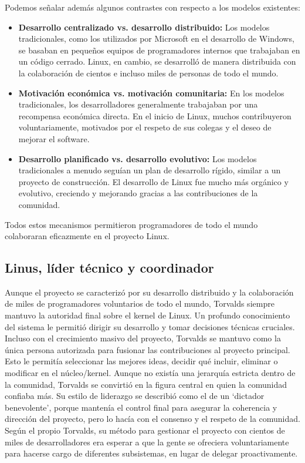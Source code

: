 \documentclass[a4paper,12pt]{article}
\begin{document}
Podemos señalar además algunos contrastes con respecto a los modelos existentes:

\begin{itemize}
    \item \textbf{Desarrollo centralizado vs. desarrollo distribuido:} 
        Los modelos tradicionales, como los utilizados por Microsoft en el
        desarrollo de Windows, se basaban en pequeños equipos de programadores
        internos que trabajaban en un código cerrado. Linux, en cambio, se
        desarrolló de manera distribuida con la colaboración de cientos e
        incluso miles de personas de todo el mundo.
    \item \textbf{Motivación económica vs. motivación comunitaria:}  En los
    modelos tradicionales, los desarrolladores generalmente trabajaban por una
    recompensa económica directa. En el inicio de Linux, muchos contribuyeron
    voluntariamente, motivados por el respeto de sus colegas y el deseo de
    mejorar el software.
    \item \textbf{Desarrollo planificado vs. desarrollo evolutivo:} Los modelos
    tradicionales a menudo seguían un plan de desarrollo rígido, similar a un
    proyecto de construcción. El desarrollo de Linux fue mucho más orgánico y
    evolutivo, creciendo y mejorando gracias a las contribuciones de la comunidad.
\end{itemize}

Todos estos mecanismos permitieron programadores de todo el mundo colaboraran
eficazmente en el proyecto Linux.

\subsection{Linus, líder técnico y coordinador}
Aunque el proyecto se caracterizó por su desarrollo distribuido y la
colaboración de miles de programadores voluntarios de todo el mundo, Torvalds
siempre mantuvo la autoridad final sobre el kernel de Linux.
Un profundo conocimiento del sistema le permitió dirigir su desarrollo y tomar
decisiones técnicas cruciales. Incluso con el crecimiento masivo del proyecto,
Torvalds se mantuvo como la única persona autorizada para fusionar las
contribuciones al proyecto principal. Esto le permitía seleccionar las mejores
ideas, decidir qué incluir, eliminar o modificar en el núcleo/kernel. 
Aunque no existía una jerarquía estricta dentro de la comunidad, Torvalds se
convirtió en la figura central en quien la comunidad confiaba más. Su estilo de
liderazgo se describió como el de un `dictador benevolente', porque mantenía el
control final para asegurar la coherencia y dirección del proyecto, pero lo
hacía con el consenso y el respeto de la comunidad. Según el propio Torvalds, su
método para gestionar el proyecto con cientos de miles de desarrolladores era
esperar a que la gente se ofreciera voluntariamente para hacerse cargo de
diferentes subsistemas, en lugar de delegar proactivamente.
\end{document}
